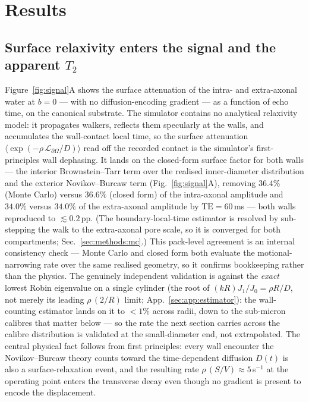 \section{Results}
\label{sec:results}

\subsection{Surface relaxivity enters the signal and the apparent $T_2$}
\label{sec:results:signal}

Figure~\ref{fig:signal}A shows the surface attenuation of the intra- and
extra-axonal water at $b=0$ --- with no diffusion-encoding gradient --- as a
function of echo time, on the canonical substrate. The simulator contains no
analytical relaxivity model: it propagates walkers, reflects them specularly at the
walls, and accumulates the wall-contact local time, so the surface attenuation
$\langle\exp(-\rho\,\mathcal L_{\partial\Omega}/D)\rangle$ read off the recorded
contact is the simulator's first-principles wall dephasing. It lands on the
closed-form surface factor for both walls --- the interior Brownstein--Tarr term
over the realised inner-diameter distribution and the exterior Novikov--Burcaw
term (Fig.~\ref{fig:signal}A), removing $36.4\%$ (Monte Carlo) versus $36.6\%$ (closed form) of
the intra-axonal amplitude and $34.0\%$ versus $34.0\%$ of the extra-axonal amplitude by
$\mathrm{TE}=60$\,ms --- both walls reproduced to ${\lesssim}0.2$\,pp. (The boundary-local-time
estimator is resolved by sub-stepping the walk to the extra-axonal pore scale, so it is
converged for both compartments; Sec.~\ref{sec:methods:mc}.) This pack-level agreement is an
internal consistency check --- Monte Carlo and closed form both evaluate the motional-narrowing
rate over the same realised geometry, so it confirms bookkeeping rather than the physics. The genuinely independent
validation is against the \emph{exact} lowest Robin eigenvalue on a single cylinder (the root
of $(kR)J_1/J_0=\rho R/D$, not merely its leading $\rho\,(2/R)$ limit;
App.~\ref{sec:app:estimator}): the wall-counting estimator lands on it to $<1\%$ across radii,
down to the sub-micron calibres that matter below --- so the rate the next section carries
across the calibre distribution is validated at the small-diameter end, not extrapolated. The central
physical fact follows from first principles: every wall encounter the Novikov--Burcaw
theory counts toward the time-dependent diffusion $D(t)$ is also a surface-relaxation
event, and the resulting rate $\rho\,(S/V)\approx5$\,s$^{-1}$ at the operating point
enters the transverse decay even though no gradient is present to encode the displacement.

